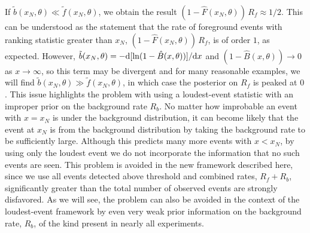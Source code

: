 \documentclass[aps,prd,reprint,nofootinbib]{revtex4-1}
\begin{document}
If $\tilde{b}(x_N,\theta) \ll \tilde{f}(x_N,\theta)$, we obtain the
result $(1- \hat{F}(x_N,\theta))\,R_f \approx 1/2$. This can be
understood as the statement that the rate of foreground events with
ranking statistic greater than $x_N$, $(1- \hat{F}(x_N,\theta))\,R_f$,
is of order $1$, as expected. However, $\tilde{b}(x_N,\theta) = -{\rm
  d} [\ln(1-\hat{B}(x,\theta))]/{\rm d}x$ and $(1-\hat{B}(x,\theta))
\rightarrow 0$ as $x \rightarrow \infty$, so this term may be
divergent and for many reasonable examples, we will find
$\tilde{b}(x_N,\theta) \gg \tilde{f}(x_N,\theta)$, in which case the
posterior on $R_f$ is peaked at $0$. This issue highlights the problem
with using a loudest-event statistic with an improper prior on the
background rate $R_b$. No matter how improbable an event with $x=x_N$
is under the background distribution, it can become likely that the
event at $x_N$ is from the background distribution by taking the
background rate to be sufficiently large. Although this predicts many
more events with $x < x_N$, by using only the loudest event we do not
incorporate the information that no such events are seen. This problem
is avoided in the new framework described here, since we use all
events detected above threshold and combined rates, $R_f+R_b$,
significantly greater than the total number of observed events are
strongly disfavored.  As we will see, the problem can also be avoided
in the context of the loudest-event framework by even very weak prior
information on the background rate, $R_b$, of the kind present in
nearly all experiments.
\end{document}
